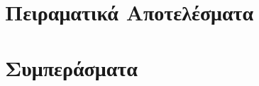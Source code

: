 \documentclass{beamer}
\begin{document}
\section{Πειραματικά Αποτελέσματα}

\begin{frame}
  \frametitle{}
\end{frame}

\begin{frame}
  \frametitle{}
\end{frame}

\begin{frame}
  \frametitle{}
\end{frame}

\section{Συμπεράσματα}

\begin{frame}
  \frametitle{}
\end{frame}

\begin{frame}
  \frametitle{}
\end{frame}

\begin{frame}
  \frametitle{}
\end{frame}
\end{document}
